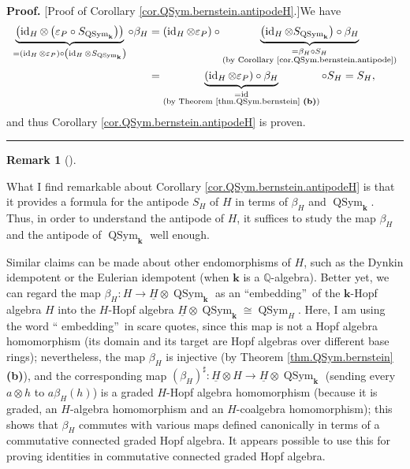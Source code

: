 \documentclass
[numbers=enddot,12pt,final,onecolumn,notitlepage,abstracton]{scrartcl}%
\theoremstyle{definition}
\newtheorem{remk}[theo]{Remark}
\newenvironment{remark}[1][]
{\begin{remk}[#1]\begin{leftbar}}
{\end{leftbar}\end{remk}}
\newenvironment{proof}[1][Proof]{\noindent\textbf{#1.} }{\ \rule{0.5em}{0.5em}}
\begin{document}
\begin{proof}
[Proof of Corollary \ref{cor.QSym.bernstein.antipodeH}.]We have%
\begin{align*}
\underbrace{\left(  \operatorname*{id}\nolimits_{H}\otimes\left(
\varepsilon_{P}\circ S_{\operatorname*{QSym}\nolimits_{\mathbf{k}}}\right)
\right)  }_{=\left(  \operatorname*{id}\nolimits_{H}\otimes\varepsilon
_{P}\right)  \circ\left(  \operatorname*{id}\nolimits_{H}\otimes
S_{\operatorname*{QSym}\nolimits_{\mathbf{k}}}\right)  }\circ\beta_{H}  &
=\left(  \operatorname*{id}\nolimits_{H}\otimes\varepsilon_{P}\right)
\circ\underbrace{\left(  \operatorname*{id}\nolimits_{H}\otimes
S_{\operatorname*{QSym}\nolimits_{\mathbf{k}}}\right)  \circ\beta_{H}%
}_{\substack{=\beta_{H}\circ S_{H}\\\text{(by Corollary
\ref{cor.QSym.bernstein.antipode})}}}\\
&  =\underbrace{\left(  \operatorname*{id}\nolimits_{H}\otimes\varepsilon
_{P}\right)  \circ\beta_{H}}_{\substack{=\operatorname*{id}\\\text{(by Theorem
\ref{thm.QSym.bernstein} \textbf{(b)})}}}\circ S_{H}=S_{H},
\end{align*}
and thus Corollary \ref{cor.QSym.bernstein.antipodeH} is proven.
\end{proof}

\begin{remark}
\label{rmk.embed}What I find remarkable about Corollary
\ref{cor.QSym.bernstein.antipodeH} is that it provides a formula for the
antipode $S_{H}$ of $H$ in terms of $\beta_{H}$ and $\operatorname*{QSym}%
\nolimits_{\mathbf{k}}$. Thus, in order to understand the antipode of $H$, it
suffices to study the map $\beta_{H}$ and the antipode of
$\operatorname*{QSym}\nolimits_{\mathbf{k}}$ well enough.

Similar claims can be made about other endomorphisms of $H$, such as the
Dynkin idempotent or the Eulerian idempotent (when $\mathbf{k}$ is a
$\mathbb{Q}$-algebra). Better yet, we can regard the map $\beta_{H}%
:H\rightarrow\underline{H}\otimes\operatorname*{QSym}\nolimits_{\mathbf{k}}$
as an \textquotedblleft embedding\textquotedblright\ of the $\mathbf{k}$-Hopf
algebra $H$ into the $H$-Hopf algebra $\underline{H}\otimes
\operatorname*{QSym}\nolimits_{\mathbf{k}}\cong\operatorname*{QSym}%
\nolimits_{H}$. Here, I am using the word \textquotedblleft
embedding\textquotedblright\ in scare quotes, since this map is not a Hopf
algebra homomorphism (its domain and its target are Hopf algebras over
different base rings); nevertheless, the map $\beta_{H}$ is injective (by
Theorem \ref{thm.QSym.bernstein} \textbf{(b)}), and the corresponding map
$\left(  \beta_{H}\right)  ^{\sharp}:\underline{H}\otimes H\rightarrow
\underline{H}\otimes\operatorname*{QSym}\nolimits_{\mathbf{k}}$ (sending every
$a\otimes h$ to $a\beta_{H}\left(  h\right)  $) is a graded $H$-Hopf algebra
homomorphism (because it is graded, an $H$-algebra homomorphism and an
$H$-coalgebra homomorphism); this shows that $\beta_{H}$ commutes with various
maps defined canonically in terms of a commutative connected graded Hopf
algebra. It appears possible to use this for proving identities in commutative
connected graded Hopf algebra.
\end{remark}
\end{document}
